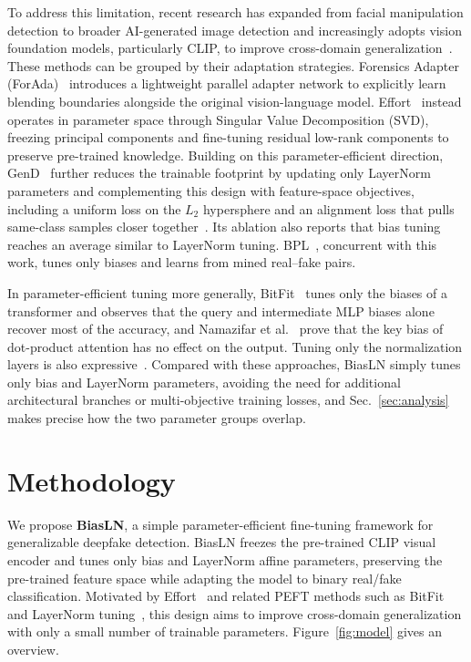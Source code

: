 \documentclass[fonts]{icst}
\newif\ifrevmark\revmarkfalse
\newcommand{\rev}[1]{\ifrevmark{\color{revblue}#1}\else#1\fi}
\begin{document}
To address this limitation, recent research has expanded from facial manipulation detection to broader AI-generated image detection and increasingly adopts vision foundation models, particularly CLIP, to improve cross-domain generalization~\cite{ojha2023universal,cui2025forada,yan2025effort,yermakov2025gend}. These methods can be grouped by their adaptation strategies. \rev{Forensics Adapter (ForAda)}~\cite{cui2025forada} introduces a lightweight parallel adapter network to explicitly learn blending boundaries alongside the original vision-language model. Effort~\cite{yan2025effort} instead operates in parameter space through Singular Value Decomposition (SVD), freezing principal components and fine-tuning residual low-rank components to preserve pre-trained knowledge. Building on this parameter-efficient direction, GenD~\cite{yermakov2025gend} further reduces the trainable footprint by updating only LayerNorm parameters and complementing this design with feature-space objectives, including a uniform loss on the $L_2$ hypersphere and an alignment loss that pulls same-class samples closer together\rev{~\cite{wang2020alignment}. Its ablation also reports that bias tuning reaches an average similar to LayerNorm tuning. BPL~\cite{xu2026bpl}, concurrent with this work, tunes only biases and learns from mined real--fake pairs.}

\rev{In parameter-efficient tuning more generally, BitFit~\cite{benzaken2022bitfit} tunes only the biases of a transformer and observes that the query and intermediate MLP biases alone recover most of the accuracy, and Namazifar et al.~\cite{namazifar2023bias} prove that the key bias of dot-product attention has no effect on the output. Tuning only the normalization layers is also expressive~\cite{giannou2023layernorm,wang2022ln,valizadeh2024layernorm}.}
Compared with these approaches, BiasLN simply tunes only bias and LayerNorm parameters, avoiding the need for additional architectural branches or multi-objective training losses\rev{, and Sec.~\ref{sec:analysis} makes precise how the two parameter groups overlap.}

\section{Methodology}
\label{sec:method}

We propose \textbf{BiasLN}, a simple parameter-efficient fine-tuning framework for generalizable deepfake detection. BiasLN freezes the pre-trained CLIP visual encoder and tunes only bias and LayerNorm affine parameters, preserving the pre-trained feature space while adapting the model to binary real/fake classification. Motivated by Effort~\cite{yan2025effort} and related PEFT methods such as BitFit~\cite{benzaken2022bitfit} and LayerNorm tuning~\cite{wang2022ln}, this design aims to improve cross-domain generalization with only a small number of trainable parameters. \rev{Figure~\ref{fig:model} gives an overview.}
\end{document}
